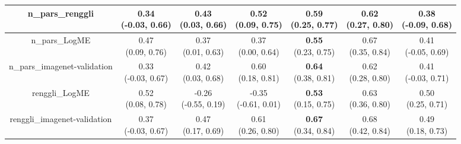 \begin{table}[H]
\begin{tabular}{c|cccccc}
\hline
n_pars_renggli & \makecell{0.34 \\[0pt] (-0.03, 0.66)} & \makecell{0.43 \\[0pt] (0.03, 0.66)} & \makecell{0.52 \\[0pt] (0.09, 0.75)} & \makecell{\textbf{0.59} \\[0pt] (0.25, 0.77)} & \makecell{0.62 \\[0pt] (0.27, 0.80)} & \makecell{0.38 \\[0pt] (-0.09, 0.68)} \\
\hline
n_pars_LogME & \makecell{0.47 \\[0pt] (0.09, 0.76)} & \makecell{0.37 \\[0pt] (0.01, 0.63)} & \makecell{0.37 \\[0pt] (0.00, 0.64)} & \makecell{\textbf{0.55} \\[0pt] (0.23, 0.75)} & \makecell{0.67 \\[0pt] (0.35, 0.84)} & \makecell{0.41 \\[0pt] (-0.05, 0.69)} \\
\hline
n_pars_imagenet-validation & \makecell{0.33 \\[0pt] (-0.03, 0.67)} & \makecell{0.42 \\[0pt] (0.03, 0.68)} & \makecell{0.60 \\[0pt] (0.18, 0.81)} & \makecell{\textbf{0.64} \\[0pt] (0.38, 0.81)} & \makecell{0.62 \\[0pt] (0.28, 0.80)} & \makecell{0.41 \\[0pt] (-0.03, 0.71)} \\
\hline
renggli_LogME & \makecell{0.52 \\[0pt] (0.08, 0.78)} & \makecell{-0.26 \\[0pt] (-0.55, 0.19)} & \makecell{-0.35 \\[0pt] (-0.61, 0.01)} & \makecell{\textbf{0.53} \\[0pt] (0.15, 0.75)} & \makecell{0.63 \\[0pt] (0.36, 0.80)} & \makecell{0.50 \\[0pt] (0.25, 0.71)} \\
\hline
renggli_imagenet-validation & \makecell{0.37 \\[0pt] (-0.03, 0.67)} & \makecell{0.47 \\[0pt] (0.17, 0.69)} & \makecell{0.61 \\[0pt] (0.26, 0.80)} & \makecell{\textbf{0.67} \\[0pt] (0.34, 0.84)} & \makecell{0.68 \\[0pt] (0.42, 0.84)} & \makecell{0.49 \\[0pt] (0.18, 0.73)} \\

\end{tabular}
\end{table}
